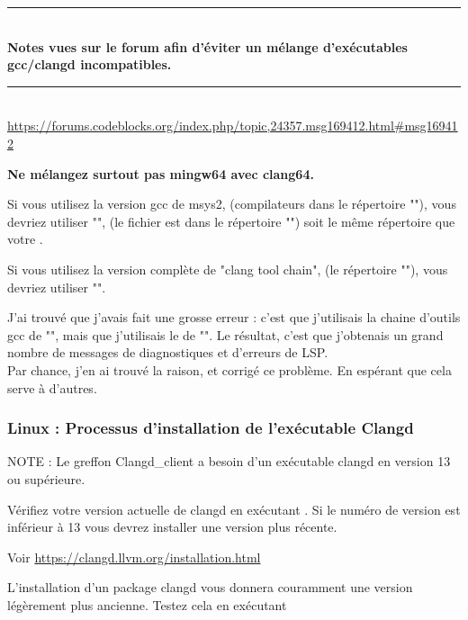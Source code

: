 \rule{\textwidth}{0.4pt} \\    
    \textbf{Notes vues sur le forum \codeblocks afin d'éviter un mélange d'exécutables gcc/clangd incompatibles.}\\
\rule{\textwidth}{0.4pt} \\  
    {\small \url{https://forums.codeblocks.org/index.php/topic,24357.msg169412.html#msg169412}}

    \textbf{Ne mélangez surtout pas mingw64 avec clang64.}
    
    Si vous utilisez la version gcc de msys2, (compilateurs dans le répertoire ""), vous devriez utiliser "", (le fichier  est dans le répertoire "") soit le même répertoire que votre .
 
	Si vous utilisez la version complète de "clang tool chain", (le répertoire ""), vous devriez utiliser "".

	J'ai trouvé que j'avais fait une grosse erreur : c'est que j'utilisais la chaine d'outils gcc de "", mais que j'utilisais le  de "".
    Le résultat, c'est que j'obtenais un grand nombre de messages de diagnostiques et d'erreurs de LSP.\\
    Par chance, j'en ai trouvé la raison, et corrigé ce problème. En espérant que cela serve à d'autres.

\subsubsection{Linux : Processus d'installation de l'exécutable Clangd}\label{sec:linux_install}

NOTE : Le greffon Clangd\_client a besoin d'un exécutable clangd en version 13 ou supérieure.

Vérifiez votre version actuelle de clangd en exécutant .\newline
Si le numéro de version est inférieur à 13 vous devrez installer une version plus récente.

Voir \url{https://clangd.llvm.org/installation.html}

L'installation d'un package clangd vous donnera couramment une version légèrement plus ancienne.\newline
Testez cela en exécutant 

